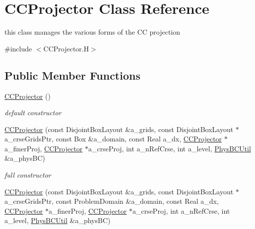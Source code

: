 \hypertarget{class_c_c_projector}{\section{C\-C\-Projector Class Reference}
\label{class_c_c_projector}
}


this class manages the various forms of the C\-C projection  




{\ttfamily \#include $<$C\-C\-Projector.\-H$>$}

\subsection*{Public Member Functions}
\begin{DoxyCompactItemize}
\item 
\hypertarget{class_c_c_projector_a547db2c47a61e24635b4c6ddee960b77}{\hyperlink{class_c_c_projector_a547db2c47a61e24635b4c6ddee960b77}{C\-C\-Projector} ()}\label{class_c_c_projector_a547db2c47a61e24635b4c6ddee960b77}

\begin{DoxyCompactList}\small\item\em default constructor \end{DoxyCompactList}\item 
\hypertarget{class_c_c_projector_a7c30d55680a13c7c7f63b10e9e36b0cb}{\hyperlink{class_c_c_projector_a7c30d55680a13c7c7f63b10e9e36b0cb}{C\-C\-Projector} (const Disjoint\-Box\-Layout \&a\-\_\-grids, const Disjoint\-Box\-Layout $\ast$a\-\_\-crse\-Grids\-Ptr, const Box \&a\-\_\-domain, const Real a\-\_\-dx, \hyperlink{class_c_c_projector}{C\-C\-Projector} $\ast$a\-\_\-finer\-Proj, \hyperlink{class_c_c_projector}{C\-C\-Projector} $\ast$a\-\_\-crse\-Proj, int a\-\_\-n\-Ref\-Crse, int a\-\_\-level, \hyperlink{class_phys_b_c_util}{Phys\-B\-C\-Util} \&a\-\_\-phys\-B\-C)}\label{class_c_c_projector_a7c30d55680a13c7c7f63b10e9e36b0cb}

\begin{DoxyCompactList}\small\item\em full constructor \end{DoxyCompactList}\item 
\hypertarget{class_c_c_projector_aadbd3ece02dccc91c1255c2512b38673}{\hyperlink{class_c_c_projector_aadbd3ece02dccc91c1255c2512b38673}{C\-C\-Projector} (const Disjoint\-Box\-Layout \&a\-\_\-grids, const Disjoint\-Box\-Layout $\ast$a\-\_\-crse\-Grids\-Ptr, const Problem\-Domain \&a\-\_\-domain, const Real a\-\_\-dx, \hyperlink{class_c_c_projector}{C\-C\-Projector} $\ast$a\-\_\-finer\-Proj, \hyperlink{class_c_c_projector}{C\-C\-Projector} $\ast$a\-\_\-crse\-Proj, int a\-\_\-n\-Ref\-Crse, int a\-\_\-level, \hyperlink{class_phys_b_c_util}{Phys\-B\-C\-Util} \&a\-\_\-phys\-B\-C)}\label{class_c_c_projector_aadbd3ece02dccc91c1255c2512b38673}


\end{DoxyCompactItemize}
